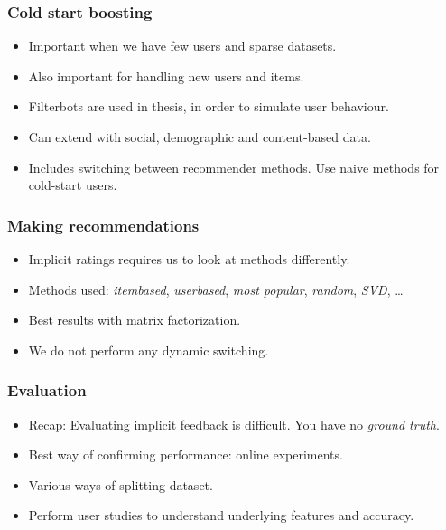 \documentclass{beamer}
\begin{document}
  \begin{frame}
    \frametitle{Cold start boosting}
    \begin{itemize}
      \item Important when we have few users and sparse datasets.
      \item Also important for handling new users and items.
      \item Filterbots are used in thesis, in order to simulate user behaviour.
      \item Can extend with social, demographic and content-based data.
      \item Includes switching between recommender methods. Use naive methods
      for cold-start users.
    \end{itemize}
  \end{frame}

  \begin{frame}
    \frametitle{Making recommendations}
    \begin{itemize}
      \item Implicit ratings requires us to look at methods differently.
      \item Methods used: \textit{itembased}, \textit{userbased}, \textit{most
      popular}, \textit{random}, \textit{SVD}, \dots
      \item Best results with matrix factorization.
      \item We do not perform any dynamic switching.
    \end{itemize}
  \end{frame}

  \begin{frame}
    \frametitle{Evaluation}
    \begin{itemize}
      \item Recap: Evaluating implicit feedback is difficult. You have no
      \textit{ground truth}.
      \item Best way of confirming performance: online experiments.
      \item Various ways of splitting dataset.
      \item Perform user studies to understand underlying features and
      accuracy.
    \end{itemize}
  \end{frame}
\end{document}

